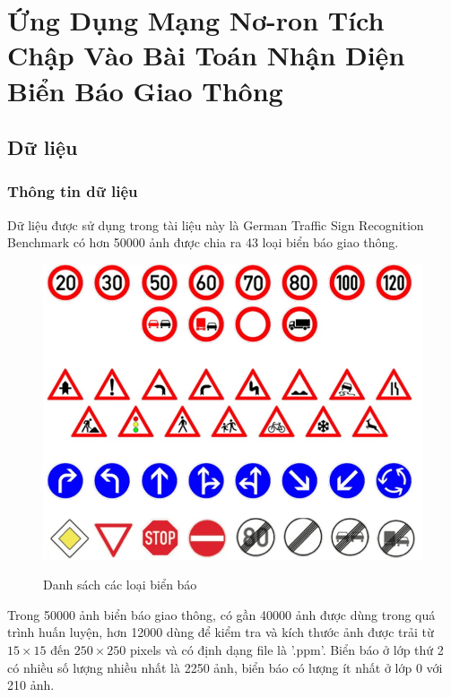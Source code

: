 \everymath{\displaystyle}

\chapter{Ứng Dụng Mạng Nơ-ron Tích Chập Vào Bài Toán Nhận Diện Biển Báo Giao Thông }
\label{chap:chap5}

\section{Dữ liệu}
\subsection{Thông tin dữ liệu}
\hspace{5mm}Dữ liệu được sử dụng trong tài liệu này là German Traffic Sign Recognition Benchmark \cite{GTSRB} có hơn 50000 ảnh được chia ra 43 loại biển báo giao thông. 
\begin{figure}[H]
\begin{center}
\label{fig:data_sample}
\includegraphics[scale=0.5]{chap5/image/data_sample.png}
\caption{Danh sách các loại biển báo}
\end{center}
\end{figure}
Trong 50000 ảnh biển báo giao thông, có gần 40000 ảnh được dùng trong quá trình huấn luyện, hơn 12000 dùng để kiểm tra và kích thước ảnh được trải từ $15\times 15$ đến $250\times250$ pixels và có định dạng file là '.ppm'. Biển báo ở lớp thứ 2 có nhiều số lượng nhiều nhất là 2250 ảnh, biển báo có lượng ít nhất ở lớp 0 với 210 ảnh.
